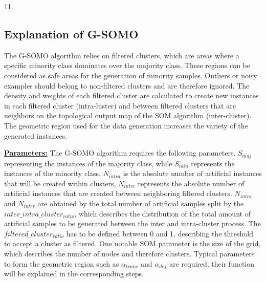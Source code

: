 \documentclass[parskip=full]{scrartcl}
\begin{document}
\begin{algorithm}[H]
	11. 	
\vspace{\baselineskip}
\end{algorithm}

\subsection{Explanation of G-SOMO}

The G-SOMO algorithm relies on filtered clusters, which are areas where a
specific minority class dominates over the majority class. These regions can be
considered as safe areas for the generation of minority samples. Outliers or
noisy examples should belong to non-filtered clusters and are therefore ignored.
The density and weights of each filtered cluster are calculated to create new
instances in each filtered cluster (intra-luster) and between filtered clusters
that are neighbors on the topological output map of the SOM algorithm
(inter-cluster). The geometric region used for the data generation increases the
variety of the generated instances. 

\textbf{\underline{Parameters:}} The G-SOMO algorithm requires the following
parameters. $S_{maj}$ representing the instances of the majority class, while
$S_{min}$ represents the instances of the minority class. $N_{intra}$ is the
absolute number of artificial instances that will be created within clusters,
$N_{inter}$ represents the absolute number of artificial instances that are
created between neighboring filtered clusters. $N_{intra}$ and $N_{inter}$ are
obtained by the total number of artificial samples split by the
$inter\_intra\_cluster_{ratio}$, which describes the distribution of the total
amount of artificial samples to be generated between the inter and intra-cluster
process. The $filtered\_cluster_{ratio}$ has to be defined between 0 and 1,
describing the threshold to accept a cluster as filtered. One notable SOM
parameter is the size of the grid, which describes the number of nodes and
therefore clusters. Typical parameters to form the geometric region such as
$\alpha_{trunc}$ and $\alpha_{def}$ are required, their function will be
explained in the corresponding steps. 
\end{document}
